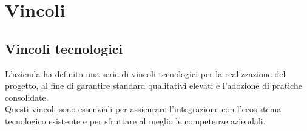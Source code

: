 \pagebreak

\section{Vincoli}
\label{sez:vincoli}

\subsection{Vincoli tecnologici}
\label{subsec:vincoli-tecnologici}

L’azienda ha definito una serie di vincoli tecnologici per la realizzazione del progetto, al fine di garantire standard qualitativi elevati e l’adozione di pratiche consolidate.\\
Questi vincoli sono essenziali per assicurare l’integrazione con l’ecosistema tecnologico esistente e per sfruttare al meglio le competenze aziendali.\\

